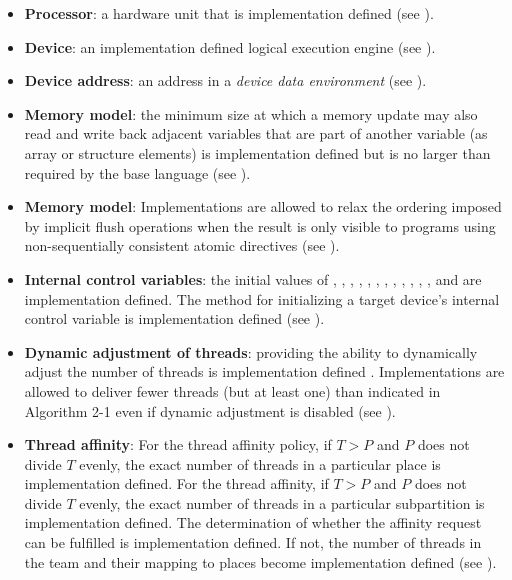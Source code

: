 \begin{itemize}
\item \textbf{Processor}: a hardware unit that is implementation defined (see 
). 

\item \textbf{Device}: an implementation defined logical execution engine (see 
). 

\item \textbf{Device address}: an address in a \emph{device data environment} (see ).

\item \textbf{Memory model}: the minimum size at which a memory update may also read and 
write back adjacent variables that are part of another variable (as array or structure 
elements) is implementation defined but is no larger than required by the base 
language (see ).

\item \textbf{Memory model}: Implementations are allowed to relax the ordering imposed by
implicit flush operations when the result is only visible to programs using 
non-sequentially consistent atomic directives (see ). 

\item \textbf{Internal control variables}: the initial values of 
, , , , 
, , , 
, , 
, , , 
 and  are implementation defined.  The method for
initializing a target device's internal control variable is
implementation defined (see ).

\item \textbf{Dynamic adjustment of threads}: providing the ability to dynamically adjust the 
number of threads is implementation defined . Implementations are allowed to deliver 
fewer threads (but at least one) than indicated in Algorithm 2-1 even if dynamic 
adjustment is disabled (see ).

\item \textbf{Thread affinity}: For the  thread affinity
  policy, if $T > P$ and $P$ does not divide $T$ evenly, the exact
  number of threads in a particular place is implementation defined.
  For the  thread affinity, if $T > P$ and $P$ does not
  divide $T$ evenly, the exact number of threads in a particular
  subpartition is implementation defined.  The determination of
  whether the affinity request can be fulfilled is implementation
  defined.  If not, the number of threads in the team and their mapping
  to places become implementation defined (see
  ).


\end{itemize}
